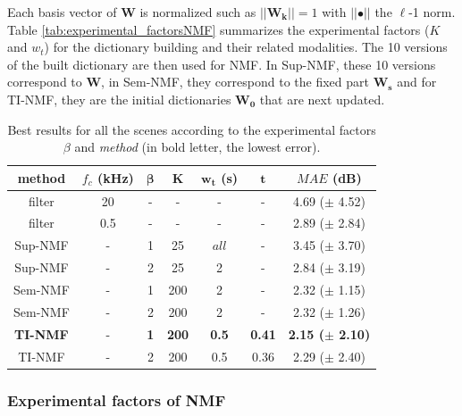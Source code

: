 \documentclass[twocolumn]{svjour3}          %
\begin{document}
Each basis vector of $\mathbf{W}$ is normalized such as $\vert \vert \mathbf{W_k} \vert \vert = 1$ with $\vert \vert \bullet \vert\vert$ the $\ell$-1 norm. Table \ref{tab:experimental_factorsNMF} summarizes the experimental factors ($K$ and $w_t$) for the dictionary building and their related modalities. The 10 versions of the built dictionary are then used for NMF. In Sup-NMF, these 10 versions correspond to $\mathbf{W}$, in Sem-NMF, they correspond to the fixed part $\mathbf{W_s}$ and for TI-NMF, they are the initial dictionaries $\mathbf{W_0}$ that are next updated.

\begin{table}[t]
\centering
\caption{Best results for all the scenes according to the experimental factors $\beta$ and \textit{method} (in bold letter, the lowest error).}
\begin{tabular}{@{}ccccccc@{}}
\toprule
\textbf{method} & $f_c$ (kHz) & $\mathbf{\beta}$ & $\mathbf{K}$ & $\mathbf{w_t}$ (s) &   $\mathbf{t}$ & \textbf{$MAE$} (dB) \\ \midrule
filter & 20  & - & - & - & - & 4.69 ($\pm$ 4.52) \\
filter & 0.5 & - &-  & - & - & 2.89 ($\pm$ 2.84) \\ \hline \hline
Sup-NMF & - & 1 & 25 & $all$  & - & 3.45 ($\pm$ 3.70) \\
Sup-NMF & - & 2 & 25 & 2  & - & 2.84 ($\pm$ 3.19) \\ \hline \hline
Sem-NMF & - & 1 & 200 & 2 & -  & 2.32 ($\pm$ 1.15) \\
Sem-NMF & - & 2 & 200 & 2 & -  & 2.32 ($\pm$ 1.26) \\ \hline \hline
\textbf{TI-NMF} & - & \textbf{1} & \textbf{200} & \textbf{0.5} &  \textbf{0.41} &\textbf{2.15 ($\pm$ 2.10)} \\
TI-NMF & - & 2 & 200 & 0.5 &  0.36 & 2.29 ($\pm$ 2.40)\\ \bottomrule
\end{tabular}
\label{tab:results}
\end{table}


\subsubsection{Experimental factors of NMF}
\end{document}

